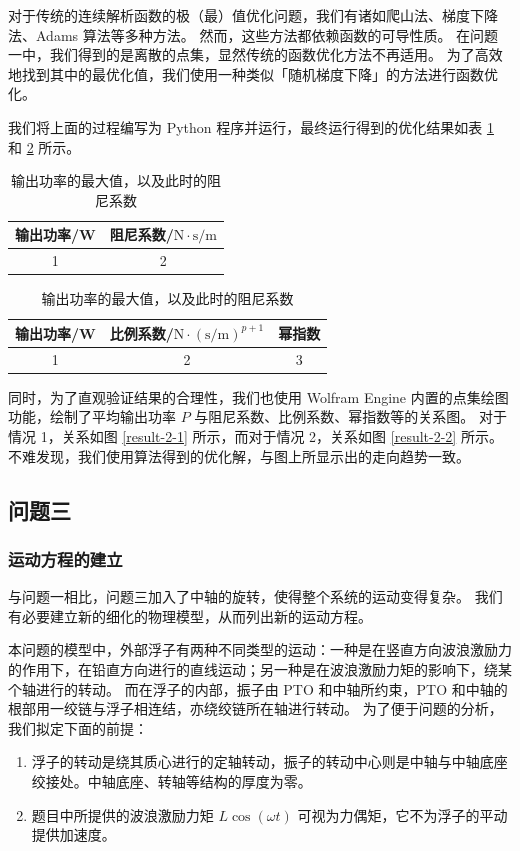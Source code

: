 对于传统的连续解析函数的极（最）值优化问题，我们有诸如爬山法、梯度下降法、Adams 算法等多种方法。
然而，这些方法都依赖函数的可导性质。
在问题一中，我们得到的是离散的点集，显然传统的函数优化方法不再适用。
为了高效地找到其中的最优化值，我们使用一种类似「随机梯度下降」的方法进行函数优化。


我们将上面的过程编写为 Python 程序并运行，最终运行得到的优化结果如表 \ref{answer-2-1} 和 \ref{answer-2-2} 所示。
\begin{table}[htbp]
    \centering
    \begin{tabular}{cc}
        \toprule
        输出功率/W & 阻尼系数/$\mathrm{N}\cdot\mathrm{s}/\mathrm{m}$ \\
        \midrule
        1 & 2 \\
        \bottomrule
    \end{tabular}
    \caption{输出功率的最大值，以及此时的阻尼系数}
    \label{answer-2-1}
\end{table}

\begin{table}[htbp]
    \centering
    \begin{tabular}{ccc}
        \toprule
        输出功率/W & 比例系数/$\mathrm{N}\cdot(\mathrm{s}/\mathrm{m})^{p+1}$ & 幂指数 \\
        \midrule
        1 & 2 & 3 \\
        \bottomrule
    \end{tabular}
    \caption{输出功率的最大值，以及此时的阻尼系数}
    \label{answer-2-2}
\end{table}

同时，为了直观验证结果的合理性，我们也使用 Wolfram Engine 内置的点集绘图功能，绘制了平均输出功率 $P$ 与阻尼系数、比例系数、幂指数等的关系图。
对于情况 1，关系如图 \ref{result-2-1} 所示，而对于情况 2，关系如图 \ref{result-2-2} 所示。
不难发现，我们使用算法得到的优化解，与图上所显示出的走向趋势一致。

\subsection{问题三}

\subsubsection{运动方程的建立}

与问题一相比，问题三加入了中轴的旋转，使得整个系统的运动变得复杂。
我们有必要建立新的细化的物理模型，从而列出新的运动方程。

本问题的模型中，外部浮子有两种不同类型的运动：一种是在竖直方向波浪激励力的作用下，在铅直方向进行的直线运动；另一种是在波浪激励力矩的影响下，绕某个轴进行的转动。
而在浮子的内部，振子由 PTO 和中轴所约束，PTO 和中轴的根部用一绞链与浮子相连结，亦绕绞链所在轴进行转动。
为了便于问题的分析，我们拟定下面的前提：
\begin{enumerate}
    \item 浮子的转动是绕其质心进行的定轴转动，振子的转动中心则是中轴与中轴底座绞接处。中轴底座、转轴等结构的厚度为零。
    \item 题目中所提供的波浪激励力矩 $L\cos(\omega t)$ 可视为力偶矩，它不为浮子的平动提供加速度。
\end{enumerate}

